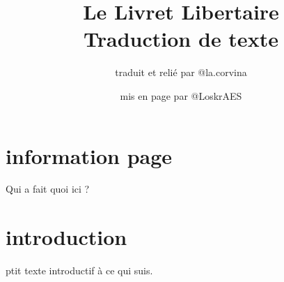 \title{Le Livret Libertaire\\[2em]\large Traduction de texte}
\author{\normalsize traduit et relié par @la.corvina \and \normalsize mis en page par @LoskrAES}

 

\frontmatter
\maketitle

\chapter*{information page}
Qui a fait quoi ici ?
\chapter*{introduction}
ptit texte introductif à ce qui suis.


\mainmatter








\backmatter
\tableofcontents
 

